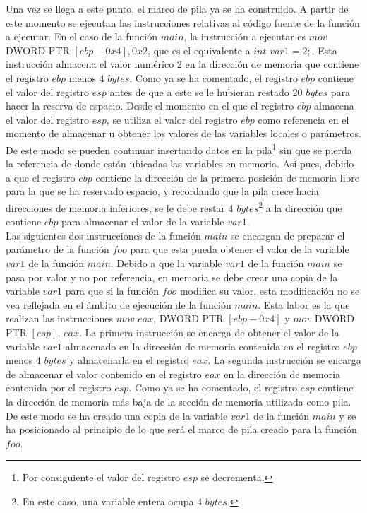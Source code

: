 \documentclass [titlepage, 12pt]{article}
\begin{document}
Una vez se llega a este punto, el marco de pila ya se ha construido. A partir de este momento se ejecutan las instrucciones relativas al c\'odigo fuente de la funci\'on a ejecutar. En el caso de la funci\'on $main$, la instrucci\'on a ejecutar es $mov$ DWORD PTR $[ebp-0x4], 0x2$, que es el equivalente a $int$ $var1 = 2;$. Esta instrucci\'on almacena el valor num\'erico 2 en la direcci\'on de memoria que contiene el registro $ebp$ menos 4 $bytes$. Como ya se ha comentado, el registro $ebp$ contiene el valor del registro $esp$ antes de que a este se le hubieran restado 20 $bytes$ para hacer la reserva de espacio. Desde el momento en el que el registro $ebp$ almacena el valor del registro $esp$, se utiliza el valor del registro $ebp$ como referencia en el momento de almacenar u obtener los valores de las variables locales o par\'ametros. De este modo se pueden continuar insertando datos en la pila\footnote{Por consiguiente el valor del registro $esp$ se decrementa.} sin que se pierda la referencia de donde est\'an ubicadas las variables en memoria. As\'i pues, debido a que el registro $ebp$ contiene la direcci\'on de la primera posici\'on de memoria libre para la que se ha reservado espacio, y recordando que la pila crece hacia direcciones de memoria inferiores, se le debe restar 4 $bytes$\footnote{En este caso, una variable entera ocupa 4 $bytes$.} a la direcci\'on que contiene $ebp$ para almacenar el valor de la variable $var1$. \\

Las siguientes dos instrucciones de la funci\'on $main$ se encargan de preparar el par\'ametro de la funci\'on $foo$ para que esta pueda obtener el valor de la variable $var1$ de la funci\'on $main$. Debido a que la variable $var1$ de la funci\'on $main$ se pasa por valor y no por referencia, en memoria se debe crear una copia de la variable $var1$ para que si la funci\'on $foo$ modifica su valor, esta modificaci\'on no se vea reflejada en el \'ambito de ejecuci\'on de la funci\'on $main$. Esta labor es la que realizan las instrucciones $mov$ $eax$, DWORD PTR $[ebp-0x4]$ y $mov$ DWORD PTR $[esp]$, $eax$. La primera instrucci\'on se encarga de obtener el valor de la variable $var1$ almacenado en la direcci\'on de memoria contenida en el registro $ebp$ menos 4 $bytes$ y almacenarla en el registro $eax$. La segunda instrucci\'on se encarga de almacenar el valor contenido en el registro $eax$ en la direcci\'on de memoria contenida por el registro $esp$. Como ya se ha comentado, el registro $esp$ contiene la direcci\'on de memoria m\'as baja de la secci\'on de memoria utilizada como pila. De este modo se ha creado una copia de la variable $var1$ de la funci\'on $main$ y se ha posicionado al principio de lo que ser\'a el marco de pila creado para la funci\'on $foo$.\\
\end{document}
